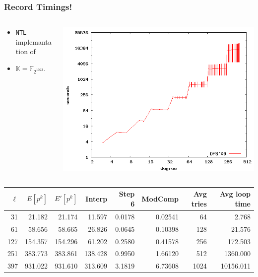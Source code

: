 \documentclass[10pt]{beamer}
\newcommand{\K}{\mathbb{K}}  %
\newcommand{\F}{\mathbb{F}}  %
\newcommand{\0}{\mathcal{O}}  %
\begin{document}
\begin{frame}
  \frametitle{Record Timings!}

  
  \begin{columns}
    \begin{column}{0.4\textwidth}
      \begin{itemize}
      \item \texttt{NTL} implemantation of \cite{DFS09}
      \item $\K = \F_{2^{1023}}$.
      \end{itemize}
    \end{column}
    \begin{column}{0.6\textwidth}
      \includegraphics[width=\textwidth]{2-1023}

    \end{column}
  \end{columns}
  
  \smallskip
  \footnotesize
  \centering
  \begin{tabular}{r r r r r r r r}
    \hline
    $\ell$ & $E[p^k]$ & $E'[p^k]$ & Interp & Step 6 & ModComp & Avg tries & Avg loop time\\
    \hline
    31 & 21.182 & 21.174 & 11.597 & 0.0178 & 0.02541 & 64 & 2.768 \\
    61 & 58.656 & 58.665 & 26.826 & 0.0645 & 0.10398 & 128 & 21.576 \\
    127 & 154.357 & 154.296 & 61.202 & 0.2580 & 0.41578 & 256 & 172.503 \\
    251 & 383.773 & 383.861 & 138.428 & 0.9950 & 1.66120 & 512 & 1360.000 \\
    397 & 931.022 & 931.610 & 313.609 & 3.1819 & 6.73608 & 1024 & 10156.011 \\
    \hline
  \end{tabular}
\end{frame}
\end{document}
